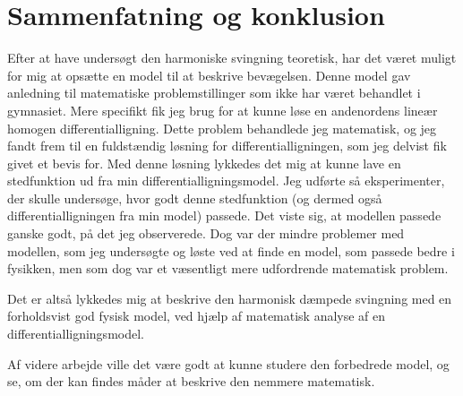 \chapter{Sammenfatning og konklusion}
Efter at have undersøgt den harmoniske svingning teoretisk, har det været muligt for mig at opsætte en model til at beskrive bevægelsen. 
Denne model gav anledning til matematiske problemstillinger som ikke har været behandlet i gymnasiet.
Mere specifikt fik jeg brug for at kunne løse en andenordens lineær homogen differentialligning. 
Dette problem behandlede jeg matematisk, og jeg fandt frem til en fuldstændig løsning for differentialligningen, som jeg delvist fik givet et bevis for. 
Med denne løsning lykkedes det mig at kunne lave en stedfunktion ud fra min differentialligningsmodel.
Jeg udførte så eksperimenter, der skulle undersøge, hvor godt denne stedfunktion (og dermed også differentialligningen fra min model) passede.
Det viste sig, at modellen passede ganske godt, på det jeg observerede.
Dog var der mindre problemer med modellen, som jeg undersøgte og løste ved at finde en model, som passede bedre i fysikken, men som dog var et væsentligt mere udfordrende matematisk problem.

Det er altså lykkedes mig at beskrive den harmonisk dæmpede svingning med en forholdsvist god fysisk model, ved hjælp af matematisk analyse af en differentialligningsmodel.
 
Af videre arbejde ville det være godt at kunne studere den forbedrede model, og se, om der kan findes måder at beskrive den nemmere matematisk. 